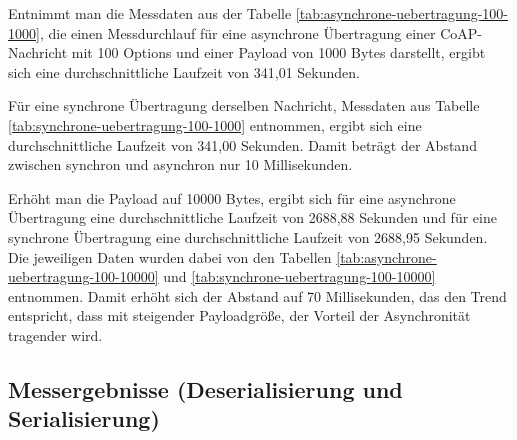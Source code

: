 \begin{table}[h]
    \caption{Synchrone Übertragung mit 100 Options und mit einer Payload von 100 Bytes.}
    \label{tab:synchrone-uebertragung-100-100}
\end{table}

Entnimmt man die Messdaten aus der Tabelle \ref{tab:asynchrone-uebertragung-100-1000}, die einen Messdurchlauf für eine asynchrone Übertragung einer CoAP-Nachricht mit 100 Options und einer Payload von 1000 Bytes darstellt, ergibt sich eine durchschnittliche Laufzeit von 341,01 Sekunden.

Für eine synchrone Übertragung derselben Nachricht, Messdaten aus Tabelle \ref{tab:synchrone-uebertragung-100-1000} entnommen, ergibt sich eine durchschnittliche Laufzeit von 341,00 Sekunden. Damit beträgt der Abstand zwischen synchron und asynchron nur 10 Millisekunden.

Erhöht man die Payload auf 10000 Bytes, ergibt sich für eine asynchrone Übertragung eine durchschnittliche Laufzeit von 2688,88 Sekunden und für eine synchrone Übertragung eine durchschnittliche Laufzeit von 2688,95 Sekunden. Die jeweiligen Daten wurden dabei von den Tabellen \ref{tab:asynchrone-uebertragung-100-10000} und \ref{tab:synchrone-uebertragung-100-10000} entnommen. Damit erhöht sich der Abstand auf 70 Millisekunden, das den Trend entspricht, dass mit steigender Payloadgröße, der Vorteil der Asynchronität tragender wird.

\subsection{Messergebnisse (Deserialisierung und Serialisierung)}
\label{subsec:messergebnisse-deserialisierung-serialisierung}


